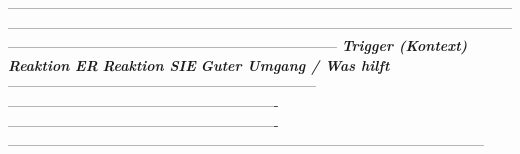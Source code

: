 {{{{-----------------------------------------------------------------------------------------------------------------------------------------------------------------------------------------------------------------------------------------------------------------------------------------------
\textbf{\textit{\textcolor{ctmmRed}{Trigger} (Kontext)}}                                            \textbf{\textit{Reaktion ER}}                                          \textbf{\textit{Reaktion SIE}}                                         \textbf{\textit{Guter Umgang / Was hilft}}
------------------------------------------------------------------ ---------------------------------------------------------- ---------------------------------------------------------- ------------------------------------------------------------------------------------------------------
\textcolor{ctmmBlue}{\faEdit}                                                                 \textcolor{ctmmBlue}{\faEdit}                                                         \textcolor{ctmmBlue}{\faEdit}                                                         \textcolor{ctmmBlue}{\faEdit}
}}}}

